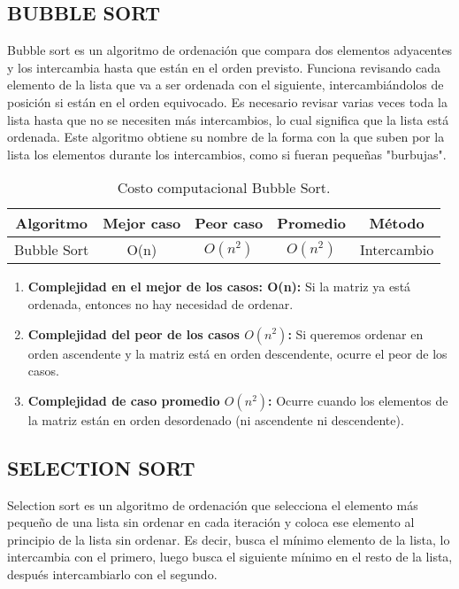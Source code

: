\documentclass{article}
\begin{document}
\subsection{BUBBLE SORT}
Bubble sort es un algoritmo de ordenación que compara dos elementos adyacentes y los intercambia hasta que están en el orden previsto. Funciona revisando cada elemento de la lista que va a ser ordenada con el siguiente, intercambiándolos de posición si están en el orden equivocado. Es necesario revisar varias veces toda la lista hasta que no se necesiten más intercambios, lo cual significa que la lista está ordenada. Este algoritmo obtiene su nombre de la forma con la que suben por la lista los elementos durante los intercambios, como si fueran pequeñas "burbujas".

    \begin{table}[H]
        \centering
        \begin{tabular}{||c c c c c||} 
         \hline
         \textbf{Algoritmo} & \textbf{Mejor caso} & \textbf{Peor caso} & \textbf{Promedio} & \textbf{Método} \\ [0.5ex] 
         \hline\hline
         Bubble Sort & O(n) & \(O(n^2)\) & \(O(n^2)\) & Intercambio \\ [0.5ex] 
         \hline
        \end{tabular}
        \caption{Costo computacional Bubble Sort.}
        \label{table:dataBubbleSort}
    \end{table}
    
    \begin{enumerate}
            \item \textbf{Complejidad en el mejor de los casos: O(n):} Si la matriz ya está ordenada, entonces no hay necesidad de ordenar.
            
            \item \textbf{Complejidad del peor de los casos \(O(n^2)\):} Si queremos ordenar en orden ascendente y la matriz está en orden descendente, ocurre el peor de los casos.
            
            \item \textbf{Complejidad de caso promedio \(O(n^2)\):} Ocurre cuando los elementos de la matriz están en orden desordenado (ni ascendente ni descendente).
    \end{enumerate}

\subsection{SELECTION SORT}
Selection sort es un algoritmo de ordenación que selecciona el elemento más pequeño de una lista sin ordenar en cada iteración y coloca ese elemento al principio de la lista sin ordenar. Es decir, busca el mínimo elemento de la lista, lo intercambia con el primero, luego busca el siguiente mínimo en el resto de la lista, después intercambiarlo con el segundo.
\end{document}
